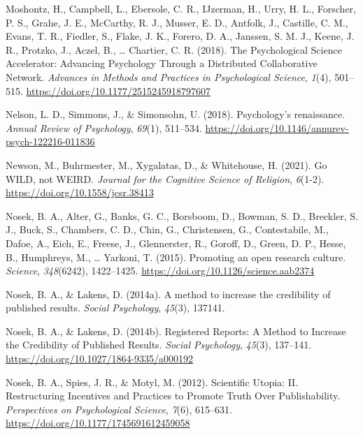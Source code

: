 \documentclass[
  man,mask,floatsintext]{apa7}
\newlength{\cslhangindent}
\newlength{\cslentryspacingunit} %
\newenvironment{CSLReferences}[2] %
 {%
  \setlength{\parindent}{0pt}
  \ifodd #1
  \let\oldpar\par
  \def\par{\hangindent=\cslhangindent\oldpar}
  \fi
  \setlength{\parskip}{#2\cslentryspacingunit}
 }%
 {}
\begin{document}
\begin{CSLReferences}{1}{0}
\leavevmode{}%
Moshontz, H., Campbell, L., Ebersole, C. R., IJzerman, H., Urry, H. L., Forscher, P. S., Grahe, J. E., McCarthy, R. J., Musser, E. D., Antfolk, J., Castille, C. M., Evans, T. R., Fiedler, S., Flake, J. K., Forero, D. A., Janssen, S. M. J., Keene, J. R., Protzko, J., Aczel, B., \ldots{} Chartier, C. R. (2018). The Psychological Science Accelerator: Advancing Psychology Through a Distributed Collaborative Network. \emph{Advances in Methods and Practices in Psychological Science}, \emph{1}(4), 501--515. \url{https://doi.org/10.1177/2515245918797607}

\leavevmode{}%
Nelson, L. D., Simmons, J., \& Simonsohn, U. (2018). Psychology's renaissance. \emph{Annual Review of Psychology}, \emph{69}(1), 511--534. \url{https://doi.org/10.1146/annurev-psych-122216-011836}

\leavevmode{}%
Newson, M., Buhrmester, M., Xygalatas, D., \& Whitehouse, H. (2021). Go WILD, not WEIRD. \emph{Journal for the Cognitive Science of Religion}, \emph{6}(1-2). \url{https://doi.org/10.1558/jcsr.38413}

\leavevmode{}%
Nosek, B. A., Alter, G., Banks, G. C., Borsboom, D., Bowman, S. D., Breckler, S. J., Buck, S., Chambers, C. D., Chin, G., Christensen, G., Contestabile, M., Dafoe, A., Eich, E., Freese, J., Glennerster, R., Goroff, D., Green, D. P., Hesse, B., Humphreys, M., \ldots{} Yarkoni, T. (2015). Promoting an open research culture. \emph{Science}, \emph{348}(6242), 1422--1425. \url{https://doi.org/10.1126/science.aab2374}

\leavevmode{}%
Nosek, B. A., \& Lakens, D. (2014a). A method to increase the credibility of published results. \emph{Social Psychology}, \emph{45}(3), 137141.

\leavevmode{}%
Nosek, B. A., \& Lakens, D. (2014b). Registered Reports: A Method to Increase the Credibility of Published Results. \emph{Social Psychology}, \emph{45}(3), 137--141. \url{https://doi.org/10.1027/1864-9335/a000192}

\leavevmode{}%
Nosek, B. A., Spies, J. R., \& Motyl, M. (2012). Scientific Utopia: II. Restructuring Incentives and Practices to Promote Truth Over Publishability. \emph{Perspectives on Psychological Science}, \emph{7}(6), 615--631. \url{https://doi.org/10.1177/1745691612459058}


\end{CSLReferences}
\end{document}
